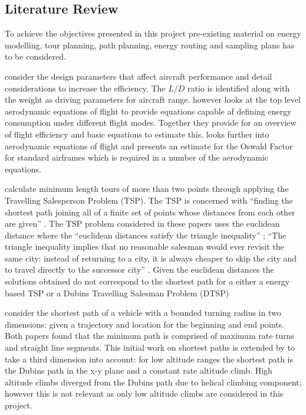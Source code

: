 \documentclass[a4paper,12pt,twoside]{article}
\begin{document}
\subsection{Literature Review}
\label{sec:literature_review}

To achieve the objectives presented in this project pre-existing material on energy modelling, tour planning, path planning, energy routing and sampling plans has to be considered.

 consider the design parameters that affect aircraft performance and detail considerations to increase the efficiency. The $L/D$ ratio is identified along with the weight as driving parameters for aircraft range.  however looks at the top level aerodynamic equations of flight to provide equations capable af defining energy consumption under different flight modes. Together they provide for an overview of flight efficiency and basic equations to estimate this.  looks further into aerodynamic equations of flight and presents an estimate for the Oswald Factor for standard airframes which is required in a number of the aerodynamic equations.

 calculate minimum length tours of more than two points through applying the Travelling Salesperson Problem (TSP). The TSP is concerned with ``finding the shortest path joining all of a finite set of points whose distances from each other are given'' \cite{Held1984}. The TSP problem considered in these papers uses the euclidean distance where the ``euclidean distances satisfy the triangle inequality'' \cite{DeBerg2010}; ``The triangle inequality implies that no reasonable salesman would ever revisit the same city: instead of returning to a city, it is always cheaper to skip the city and to travel directly to the successor city'' \cite{DeBerg2010}. Given the euclidean distances the solutions obtained do not correspond to the shortest path for a either a energy based TSP or a Dubins Travelling Salesman Problem (DTSP)

 consider the shortest path of a vehicle with a bounded turning radius in two dimensions: given a trajectory and location for the beginning and end points. Both papers found that the minimum path is comprised of maximum rate turns and straight line segments. This initial work on shortest paths is extended by  to take a third dimension into account: for low altitude ranges the shortest path is the Dubins path in the x-y plane and a constant rate altitude climb. High altitude climbs diverged from the Dubins path due to helical climbing component; however this is not relevant as only low altitude climbs are considered in this project.
\end{document}
